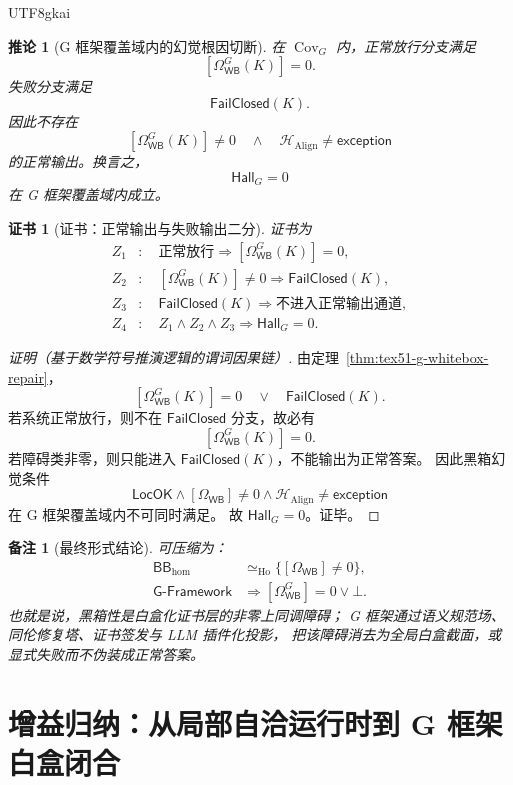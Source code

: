 \documentclass[12pt]{article}
\newtheorem{corollary}{推论}[section]
\newtheorem{remark}{备注}[section]
\newtheorem{Certificate}{证书}[section]
\newcommand{\GFramework}{\textsf{G-Framework}}
\newcommand{\LocOK}{\mathsf{LocOK}}
\newcommand{\Hall}{\mathsf{Hall}}
\newcommand{\FailClosed}{\mathsf{FailClosed}}
\newcommand{\Exc}{\mathsf{exception}}
\newcommand{\BB}{\mathsf{BB}}
\newcommand{\WB}{\mathsf{WB}}
\newcommand{\Align}{\operatorname{Align}}
\begin{document}
\begin{CJK*}{UTF8}{gkai}
\begin{corollary}[G 框架覆盖域内的幻觉根因切断]
\label{cor:tex51-g-hallucination-zero}
在 \(\operatorname{Cov}_G\) 内，正常放行分支满足
\[
  [\Omega_{\WB}^{G}(K)]=0.
\]
失败分支满足
\[
  \FailClosed(K).
\]
因此不存在
\[
  [\Omega_{\WB}^{G}(K)]\ne0
  \quad\wedge\quad
  \mathcal H_{\Align}\ne\Exc
\]
的正常输出。换言之，
\[
  \Hall_G=0
\]
在 G 框架覆盖域内成立。
\end{corollary}

\begin{Certificate}[证书：正常输出与失败输出二分]
\label{cert:tex51-g-hallucination-zero}
证书为
\[
\begin{aligned}
  Z_1&:\quad \text{正常放行}\Rightarrow [\Omega_{\WB}^{G}(K)]=0,\\
  Z_2&:\quad [\Omega_{\WB}^{G}(K)]\ne0\Rightarrow \FailClosed(K),\\
  Z_3&:\quad \FailClosed(K)\Rightarrow \text{不进入正常输出通道},\\
  Z_4&:\quad Z_1\wedge Z_2\wedge Z_3\Rightarrow \Hall_G=0.
\end{aligned}
\]
\end{Certificate}

\begin{proof}[证明（基于数学符号推演逻辑的谓词因果链）]
由定理~\ref{thm:tex51-g-whitebox-repair}，
\[
  [\Omega_{\WB}^{G}(K)]=0
  \quad\vee\quad
  \FailClosed(K).
\]
若系统正常放行，则不在 \(\FailClosed\) 分支，故必有
\[
  [\Omega_{\WB}^{G}(K)]=0.
\]
若障碍类非零，则只能进入 \(\FailClosed(K)\)，不能输出为正常答案。
因此黑箱幻觉条件
\[
  \LocOK\wedge[\Omega_{\WB}]\ne0\wedge\mathcal H_{\Align}\ne\Exc
\]
在 G 框架覆盖域内不可同时满足。
故 \(\Hall_G=0\)。证毕。
\end{proof}

\begin{remark}[最终形式结论]
可压缩为：
\[
\boxed{
\begin{aligned}
  \BB_{\hom}
  &\simeq_{\mathrm{Ho}}
  \{[\Omega_{\WB}]\ne0\},\\
  \GFramework
  &\Rightarrow
  [\Omega_{\WB}^{G}]=0\vee\bot.
\end{aligned}}
\]
也就是说，黑箱性是白盒化证书层的非零上同调障碍；
G 框架通过语义规范场、同伦修复塔、证书签发与 LLM 插件化投影，
把该障碍消去为全局白盒截面，或显式失败而不伪装成正常答案。
\end{remark}

\clearpage

\section{增益归纳：从局部自洽运行时到 G 框架白盒闭合}
\label{sec:tex51-gain-induction}


\end{CJK*}
\end{document}
